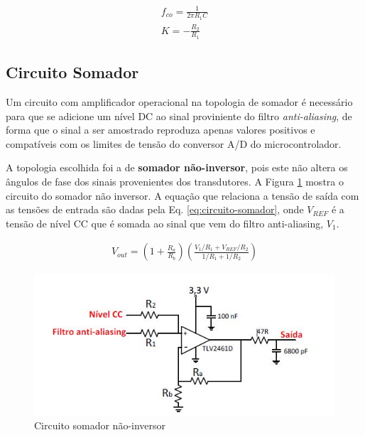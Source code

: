 \begin{align}
	f_{co} = \frac{1}{2\pi R_1 C} \label{eq:freq_corte_butter} \\
	K = -\frac{R_2}{R_1}\label{eq:ganho_butter}
\end{align}

\subsection{Circuito Somador}

Um circuito com amplificador operacional na topologia de somador é necessário para que se adicione um nível DC ao sinal proviniente do filtro \textit{anti-aliasing}, de forma que o sinal a ser amostrado reproduza apenas valores positivos e compatíveis com os limites de tensão do conversor A/D do microcontrolador. 

A topologia escolhida foi a de \textbf{somador não-inversor}, pois este não altera os ângulos de fase dos sinais provenientes dos transdutores. A Figura \ref{fig:somador-ninversor} mostra o circuito do somador não inversor. A equação que relaciona a tensão de saída com as tensões de entrada são dadas pela Eq. \ref{eq:circuito-somador}, onde $V_{REF}$ é a tensão de nível CC que é somada ao sinal que vem do filtro anti-aliasing, $V_1$.

\begin{align}
	V_{out} = \left(1+\frac{R_a}{R_b}\right)\left(\frac{V_1/R_1 + V_{REF}/R_2}{1/R_1 + 1/R_2}\right)\label{eq:circuito-somador}
\end{align}

\begin{figure}[!hbt]
	\begin{center}
		\includegraphics[scale=0.7]{figuras/somador-ninversor.JPG}
		\caption{Circuito somador não-inversor}
		\label{fig:somador-ninversor}
	\end{center}
\end{figure}

